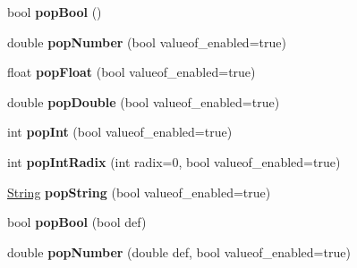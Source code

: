 \begin{DoxyCompactItemize}
\item 
bool {\bfseries pop\+Bool} ()\hypertarget{class_object_script_1_1_o_s_a29b099813fc5f8eefb4deae2682746ef}{}\label{class_object_script_1_1_o_s_a29b099813fc5f8eefb4deae2682746ef}

\item 
double {\bfseries pop\+Number} (bool valueof\+\_\+enabled=true)\hypertarget{class_object_script_1_1_o_s_a41609761079aca80848e98a110f128f8}{}\label{class_object_script_1_1_o_s_a41609761079aca80848e98a110f128f8}

\item 
float {\bfseries pop\+Float} (bool valueof\+\_\+enabled=true)\hypertarget{class_object_script_1_1_o_s_a5ce31834ae14048b31ae3bb80d6d945a}{}\label{class_object_script_1_1_o_s_a5ce31834ae14048b31ae3bb80d6d945a}

\item 
double {\bfseries pop\+Double} (bool valueof\+\_\+enabled=true)\hypertarget{class_object_script_1_1_o_s_a447af46056b7ebe8b7100c9952e81ddd}{}\label{class_object_script_1_1_o_s_a447af46056b7ebe8b7100c9952e81ddd}

\item 
int {\bfseries pop\+Int} (bool valueof\+\_\+enabled=true)\hypertarget{class_object_script_1_1_o_s_a959cd8a069c0ae634269b70995512d24}{}\label{class_object_script_1_1_o_s_a959cd8a069c0ae634269b70995512d24}

\item 
int {\bfseries pop\+Int\+Radix} (int radix=0, bool valueof\+\_\+enabled=true)\hypertarget{class_object_script_1_1_o_s_aef6e023fc0b52a5d6f9fad0e03ae4118}{}\label{class_object_script_1_1_o_s_aef6e023fc0b52a5d6f9fad0e03ae4118}

\item 
\hyperlink{class_object_script_1_1_o_s_1_1_string}{String} {\bfseries pop\+String} (bool valueof\+\_\+enabled=true)\hypertarget{class_object_script_1_1_o_s_a84f8ea62aa52ac431403c46ee405fb7c}{}\label{class_object_script_1_1_o_s_a84f8ea62aa52ac431403c46ee405fb7c}

\item 
bool {\bfseries pop\+Bool} (bool def)\hypertarget{class_object_script_1_1_o_s_a4bf5118ffc4a8147394e32975c3fa08e}{}\label{class_object_script_1_1_o_s_a4bf5118ffc4a8147394e32975c3fa08e}

\item 
double {\bfseries pop\+Number} (double def, bool valueof\+\_\+enabled=true)\hypertarget{class_object_script_1_1_o_s_a5ebdab5d6d6926e3d09f4c090f9d3b8c}{}\label{class_object_script_1_1_o_s_a5ebdab5d6d6926e3d09f4c090f9d3b8c}


\end{DoxyCompactItemize}
